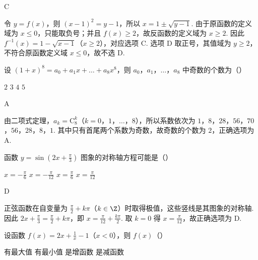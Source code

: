 \begin{answer}
C
\end{answer}

\begin{solution}
令 \(y=f(x)\)，则 \((x-1)^2=y-1\)，所以 \(x=1\pm\sqrt{y-1}\). 由于原函数的定义域为 \(x\leqslant0\)，只能取负号；并且 \(f(x)\geqslant2\)，故反函数的定义域为 \(x\geqslant2\). 因此 \(f^{-1}(x)=1-\sqrt{x-1}\)（\(x\geqslant2\)），对应选项 C. 选项 D 取正号，其值域为 \(y\geqslant2\)，不符合原函数定义域 \(x\leqslant0\)，故不选 D.
\end{solution}

\begin{problem}
设 \((1 + x)^8 = a_0 + a_1x + \dots + a_8x^8\)，则 \(a_0\)，\(a_1\)，\(\dots\)，\(a_8\) 中奇数的个数为（\quad）

\choices
    {\(2\)}
    {\(3\)}
    {\(4\)}
    {\(5\)}
\end{problem}

\begin{answer}
A
\end{answer}

\begin{solution}
由二项式定理，\(a_k=\mathrm C_8^k\)（\(k=0\)，\(1\)，\(\ldots\)，\(8\)），所以系数依次为 \(1\)，\(8\)，\(28\)，\(56\)，\(70\)，\(56\)，\(28\)，\(8\)，\(1\). 其中只有首尾两个系数为奇数，故奇数的个数为 \(2\)，正确选项为 A.
\end{solution}

\begin{problem}
函数 \( y = \sin \left(2x + \frac{\pi}{3}\right) \) 图象的对称轴方程可能是（\quad）

\choices
    {\(x = -\frac{\pi}{6}\)}
    {\(x = -\frac{\pi}{12}\)}
    {\(x = \frac{\pi}{6}\)}
    {\(x = \frac{\pi}{12}\)}
\end{problem}

\begin{answer}
D
\end{answer}

\begin{solution}
正弦函数在自变量为 \(\frac\pi2+k\pi\)（\(k\in\Z\)）时取得极值，这些竖线是其图象的对称轴. 因此 \(2x+\frac\pi3=\frac\pi2+k\pi\)，即 \(x=\frac\pi{12}+\frac{k\pi}{2}\). 取 \(k=0\) 得 \(x=\frac\pi{12}\)，故正确选项为 D.
\end{solution}

\begin{problem}
设函数 \(f(x) = 2x + \frac{1}{x} - 1\)（\(x < 0\)），则 \(f(x)\)（\quad）

\choices
    {有最大值}
    {有最小值}
    {是增函数}
    {是减函数}
\end{problem}


